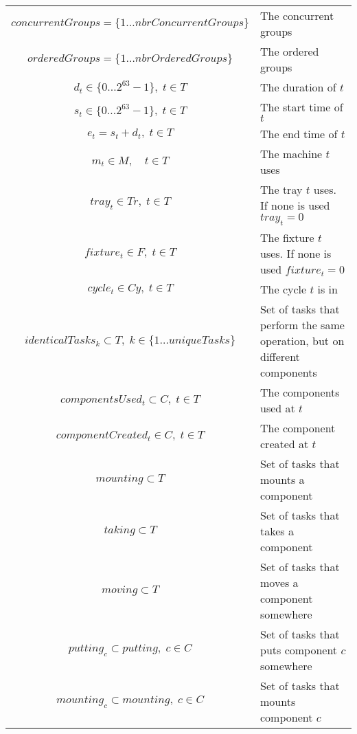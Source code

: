 \documentclass[10pt,a4paper]{report}
\begin{document}
\begin{longtable}{c p{5cm}}
$concurrentGroups = \{1 \ldots nbrConcurrentGroups\}$ & The concurrent groups\\

$orderedGroups = \{1 \ldots nbrOrderedGroups\}$ & The ordered groups \\

$d_t \in \{0 \ldots 2^{63}-1\}, \; t \in T$ & The duration of $t$ \\

$s_t \in \{0 \ldots 2^{63}-1\}, \; t \in T$ & The start time of $t$ \\

$e_t = s_t + d_t, \; t \in T$ & The end time of $t$ \\

$m_t \in M, \quad t \in T$ & The machine $t$ uses \\

$tray_t \in Tr, \; t \in T$ & The tray $t$ uses. If none is used $tray_t = 0$\\

$fixture_t \in F, \; t \in T$ & The fixture $t$ uses. If none is used $fixture_t = 0$\\

$cycle_t \in Cy, \; t \in T$ & The cycle $t$ is in \\

$identicalTasks_k \subset T, \; k \in \{1 \ldots uniqueTasks\}$ & Set of tasks that perform the same operation, but on different components \\

$componentsUsed_t \subset C, \; t \in T$ & The components used at $t$ \\

$componentCreated_t \in C, \; t \in T$ & The component created at $t$ \\

$mounting \subset T$ & Set of tasks that mounts a component \\

$taking \subset T$ & Set of tasks that takes a component \\

$moving \subset T$ & Set of tasks that moves a component somewhere \\

$putting_c \subset putting, \; c \in C$ & Set of tasks that puts component $c$ somewhere \\

$mounting_c \subset mounting, \; c \in C$ & Set of tasks that mounts component $c$\\


\end{longtable}
\end{document}

